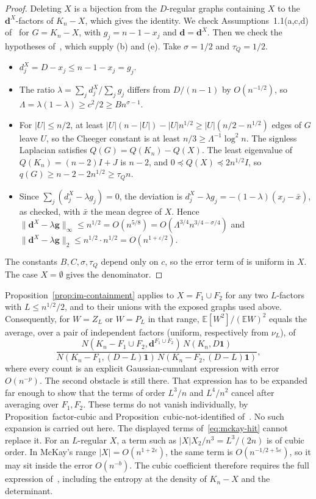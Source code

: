 \documentclass[11pt]{article}
\newcommand{\EE}{\mathbb{E}}
\begin{document}
\begin{proof}
Deleting \(X\) is a bijection from the \(D\)-regular graphs containing \(X\)
to the \(\boldsymbol d^X\)-factors of \(K_n-X\), which gives the identity.
We check Assumptions~1.1(a,c,d) of~\cite{IM25} for \(G=K_n-X\), with
\(g_j=n-1-x_j\) and \(\boldsymbol d=\boldsymbol d^X\).
Then we check the hypotheses of~\cite[Theorem~1.3]{IM25}, which supply
(b) and (e). Take \(\sigma=1/2\) and \(\tau_Q=1/2\).
\begin{itemize}
\item[(a)] \(d^X_j=D-x_j\le n-1-x_j=g_j\).
\item[(c)] The ratio \(\lambda=\sum_jd^X_j/\sum_jg_j\) differs from
\(D/(n-1)\) by \(O(n^{-1/2})\), so \(\varLambda=\lambda(1-\lambda)\ge c^2/2\ge
Bn^{\sigma-1}\).
\item[(d)] For \(|U|\le n/2\), at least \(|U|(n-|U|)-|U|n^{1/2}\ge|U|(n/2-n^{1/2})\)
edges of \(G\) leave \(U\), so the Cheeger constant is at least
\(n/3\ge\varLambda^{-1}\log^2n\).
The signless Laplacian satisfies \(Q(G)=Q(K_n)-Q(X)\).
The least eigenvalue of \(Q(K_n)=(n-2)I+J\) is \(n-2\), and
\(0\preceq Q(X)\preceq 2n^{1/2}I\), so \(q(G)\ge n-2-2n^{1/2}\ge\tau_Qn\).
\item[(Theorem~1.3)] Since \(\sum_j(d^X_j-\lambda g_j)=0\), the deviation is
\(d^X_j-\lambda g_j=-(1-\lambda)(x_j-\bar x)\), as checked, with \(\bar x\) the mean
degree of \(X\).
Hence \(\|\boldsymbol d^X-\lambda\boldsymbol g\|_\infty\le n^{1/2}=O(n^{5/8})
=O(\varLambda^{3/4}n^{3/4-\sigma/4})\) and
\(\|\boldsymbol d^X-\lambda\boldsymbol g\|_2\le n^{1/2}\cdot n^{1/2}=O(n^{1+\varepsilon/2})\).
\end{itemize}
The constants \(B,C,\sigma,\tau_Q\) depend only on \(c\), so the error term of
\cite[Theorem~1.2]{IM25} is uniform in \(X\).
The case \(X=\emptyset\) gives the denominator.
\end{proof}

Proposition~\ref{prop:im-containment} applies to \(X=F_1\cup F_2\) for any
two \(L\)-factors with \(L\le n^{1/2}/2\), and to their unions with the
exposed graphs used above.
Consequently, for \(W=Z_L\) or \(W=P_L\) in that range,
\(\EE[W^2]/(\EE W)^2\) equals the average, over a pair of independent factors
(uniform, respectively from \(\nu_L\)), of
\[
\frac{N(K_n-F_1\cup F_2,\boldsymbol d^{F_1\cup F_2})\,N(K_n,D\mathbf 1)}
{N(K_n-F_1,(D-L)\mathbf 1)\,N(K_n-F_2,(D-L)\mathbf 1)},
\]
where every count is an explicit Gaussian-cumulant expression with error
\(O(n^{-p})\).
The second obstacle is still there.
That expression has to be expanded far enough to show that the terms of
order \(L^3/n\) and \(L^4/n^2\) cancel after averaging over \(F_1,F_2\).
These terms do not vanish individually, by
Proposition~factor-cubic and Proposition~cubic-not-identified
of~\cite{PlusOneV1}.
No such expansion is carried out here.
The displayed terms of~\eqref{eq:mckay-hit} cannot replace it.
For an \(L\)-regular \(X\), a term such as \(|X|X_2/n^3=L^3/(2n)\) is of cubic
order. In McKay's range \(|X|=O(n^{1+2\varepsilon})\), the same term is
\(O(n^{-1/2+5\varepsilon})\), so it may sit inside the error \(O(n^{-b})\).
The cubic coefficient therefore requires the full expression
of~\cite[Theorem~1.2]{IM25}, including the entropy at the density of
\(K_n-X\) and the determinant.
\end{document}
